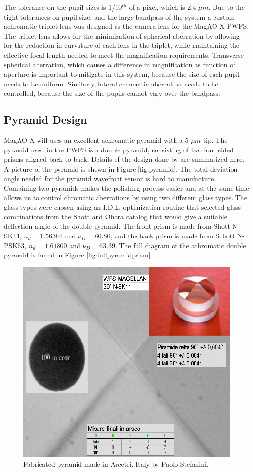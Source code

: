 The tolerance on the pupil sizes is 1/10$^{th}$ of a pixel, which is 2.4 $\mu m$. Due to the tight tolerances on pupil size, and the large bandpass of the system a custom achromatic triplet lens was designed as the camera lens for the MagAO-X PWFS. The triplet lens allows for the minimization of spherical aberration by allowing for the reduction in curvature of each lens in the triplet, while maintaining the effective focal length needed to meet the magnification requirements. Transverse spherical aberration, which causes a difference in magnification as function of aperture is important to mitigate in this system, because the size of each pupil needs to be uniform. Similarly, lateral chromatic aberration needs to be controlled, because the size of the pupils cannot vary over the bandpass.
	
	
\subsection{Pyramid Design}
MagAO-X will uses an excellent achromatic pyramid with a 5 $\mu m$ tip. The pyramid used in the PWFS is a double pyramid, consisting of two four sided prisms aligned back to back. Details of the design done by \cite{tozzi2008double} are summarized here. A picture of the pyramid is shown in Figure \ref{fig:pyramid}. The total deviation angle needed for the pyramid wavefront sensor is hard to manufacture. Combining two pyramids makes the polishing process easier and at the same time allows us to control chromatic aberrations by using two different glass types. The glass types were chosen using an I.D.L. optimization routine that selected glass combinations from the Shott and Ohara catalog that would give a suitable deflection angle of the double pyramid. The front prism is made from Shott N-SK11, $n_d=1.56384$ and $\nu_D=60.80$, and the back prism is made from Schott N-PSK53, $n_d=1.61800$ and $\nu_D=63.39$. The full diagram of the achromatic double pyramid is found in Figure \ref{fig:fullpyramidprism}.




	
\begin{figure}[h]
	\centering
	\includegraphics[width=.5\textwidth]{Chapter Materials/Chapter Three Materials/pyramid.png}
	\caption{Fabricated pyramid made in Arcetri, Italy by Paolo Stefanini.}
	\label{fig:pyramidprism}
\end{figure}
	
